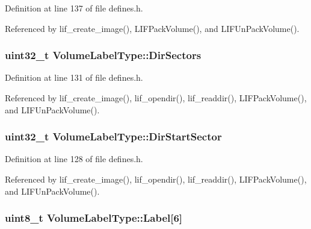 Definition at line 137 of file defines.\+h.



Referenced by lif\+\_\+create\+\_\+image(), L\+I\+F\+Pack\+Volume(), and L\+I\+F\+Un\+Pack\+Volume().

\subsubsection[{\texorpdfstring{Dir\+Sectors}{DirSectors}}]{\setlength{\rightskip}{0pt plus 5cm}uint32\+\_\+t Volume\+Label\+Type\+::\+Dir\+Sectors}\hypertarget{structVolumeLabelType_a11e35931a035c61cddc1fa20898e9466}{}\label{structVolumeLabelType_a11e35931a035c61cddc1fa20898e9466}


Definition at line 131 of file defines.\+h.



Referenced by lif\+\_\+create\+\_\+image(), lif\+\_\+opendir(), lif\+\_\+readdir(), L\+I\+F\+Pack\+Volume(), and L\+I\+F\+Un\+Pack\+Volume().

\subsubsection[{\texorpdfstring{Dir\+Start\+Sector}{DirStartSector}}]{\setlength{\rightskip}{0pt plus 5cm}uint32\+\_\+t Volume\+Label\+Type\+::\+Dir\+Start\+Sector}\hypertarget{structVolumeLabelType_aa74d0d5a4d248e42b2eb2fb95dcad4a6}{}\label{structVolumeLabelType_aa74d0d5a4d248e42b2eb2fb95dcad4a6}


Definition at line 128 of file defines.\+h.



Referenced by lif\+\_\+create\+\_\+image(), lif\+\_\+opendir(), lif\+\_\+readdir(), L\+I\+F\+Pack\+Volume(), and L\+I\+F\+Un\+Pack\+Volume().

\subsubsection[{\texorpdfstring{Label}{Label}}]{\setlength{\rightskip}{0pt plus 5cm}uint8\+\_\+t Volume\+Label\+Type\+::\+Label\mbox{[}6\mbox{]}}\hypertarget{structVolumeLabelType_ad8724768576a8eb4d697597ae9b90c21}{}\label{structVolumeLabelType_ad8724768576a8eb4d697597ae9b90c21}


